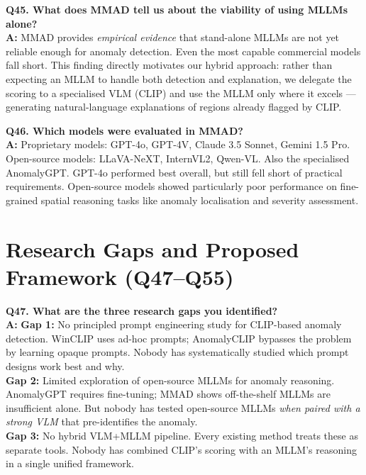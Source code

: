 \documentclass[12pt, a4paper]{article}
\begin{document}
\begin{qa}
\textbf{Q45. What does MMAD tell us about the viability of using MLLMs alone?}\\[4pt]
\textbf{A:} MMAD provides \textit{empirical evidence} that stand-alone MLLMs are not yet reliable enough for anomaly detection. Even the most capable commercial models fall short. This finding directly motivates our hybrid approach: rather than expecting an MLLM to handle both detection and explanation, we delegate the scoring to a specialised VLM (CLIP) and use the MLLM only where it excels --- generating natural-language explanations of regions already flagged by CLIP.
\end{qa}

\begin{qa}
\textbf{Q46. Which models were evaluated in MMAD?}\\[4pt]
\textbf{A:} Proprietary models: GPT-4o, GPT-4V, Claude 3.5 Sonnet, Gemini 1.5 Pro. Open-source models: LLaVA-NeXT, InternVL2, Qwen-VL. Also the specialised AnomalyGPT. GPT-4o performed best overall, but still fell short of practical requirements. Open-source models showed particularly poor performance on fine-grained spatial reasoning tasks like anomaly localisation and severity assessment.
\end{qa}

\section{Research Gaps and Proposed Framework (Q47--Q55)}

\begin{qa}
\textbf{Q47. What are the three research gaps you identified?}\\[4pt]
\textbf{A:} \textbf{Gap 1:} No principled prompt engineering study for CLIP-based anomaly detection. WinCLIP uses ad-hoc prompts; AnomalyCLIP bypasses the problem by learning opaque prompts. Nobody has systematically studied which prompt designs work best and why.\\[3pt]
\textbf{Gap 2:} Limited exploration of open-source MLLMs for anomaly reasoning. AnomalyGPT requires fine-tuning; MMAD shows off-the-shelf MLLMs are insufficient alone. But nobody has tested open-source MLLMs \textit{when paired with a strong VLM} that pre-identifies the anomaly.\\[3pt]
\textbf{Gap 3:} No hybrid VLM+MLLM pipeline. Every existing method treats these as separate tools. Nobody has combined CLIP's scoring with an MLLM's reasoning in a single unified framework.
\end{qa}
\end{document}

